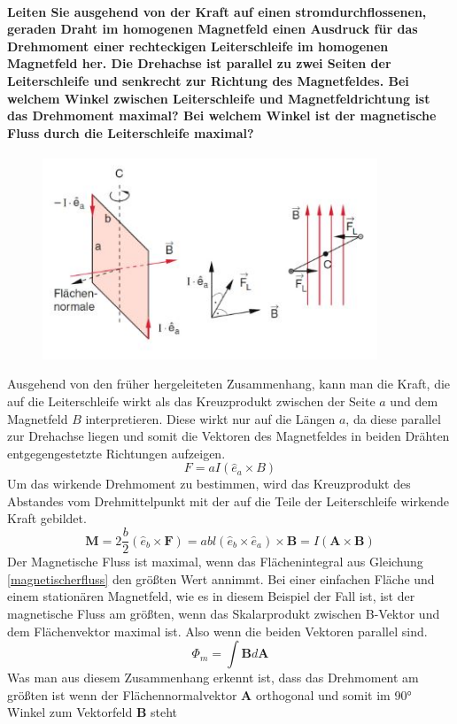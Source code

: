 \documentclass[a4paper, 11pt, ngerman, parskip=half]{scrartcl}
\begin{document}
\paragraph{Leiten Sie ausgehend von der Kraft auf einen stromdurchflossenen, geraden Draht im
homogenen Magnetfeld einen Ausdruck für das Drehmoment einer rechteckigen Leiterschleife im
homogenen Magnetfeld her. Die Drehachse ist parallel zu zwei Seiten der Leiterschleife und senkrecht
zur Richtung des Magnetfeldes. Bei welchem Winkel zwischen Leiterschleife und Magnetfeldrichtung ist
das Drehmoment maximal? Bei welchem Winkel ist der magnetische Fluss durch die Leiterschleife
maximal?}
\begin{figure}[H]
    \centering
    \label{Drehmoment}
    \includegraphics[height=6cm]{image/5/5.5.JPG}
\end{figure}
Ausgehend von den früher hergeleiteten Zusammenhang, kann man die Kraft, die auf die Leiterschleife wirkt als das Kreuzprodukt zwischen der Seite $a$ und dem Magnetfeld $B$ interpretieren. 
Diese wirkt nur auf die Längen $a$, da diese parallel zur Drehachse liegen und somit die Vektoren des Magnetfeldes in beiden Drähten entgegengestetzte Richtungen aufzeigen.
\begin{equation}
    F = a I ( \hat{e}_a \times B)
\end{equation}
Um das wirkende Drehmoment zu bestimmen, wird das Kreuzprodukt des Abstandes vom Drehmittelpunkt mit der auf die Teile der Leiterschleife wirkende Kraft gebildet.
\begin{equation}
    \textbf{M} = 2\frac{b}{2} ( \hat{e}_b \times \textbf{F}) = abl (\hat{e}_b \times \hat{e}_a) \times \textbf{B} = I(\textbf{A}\times\textbf{B})
\end{equation}
Der Magnetische Fluss ist maximal, wenn das Flächenintegral aus Gleichung \ref{magnetischerfluss} den größten Wert annimmt. Bei einer einfachen Fläche und einem stationären Magnetfeld, wie es in diesem Beispiel der Fall ist, ist der magnetische Fluss am größten, wenn das 
Skalarprodukt zwischen B-Vektor und dem Flächenvektor maximal ist. Also wenn die beiden Vektoren parallel sind.
\begin{equation}
    \label{magnetischerFluss}
    \Phi_m = \int \textbf{B} d\textbf{A}
\end{equation}
Was man aus diesem Zusammenhang erkennt ist, dass das Drehmoment am größten ist wenn der Flächennormalvektor $\textbf{A}$ orthogonal und somit im 90° Winkel zum Vektorfeld $\textbf{B}$ steht
\end{document}
